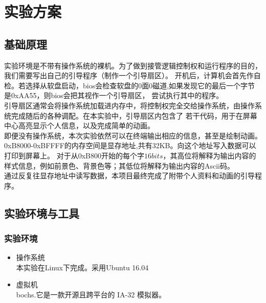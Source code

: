 \documentclass[a4paper]{article}
\begin{document}
\section{实验方案}
\subsection{基础原理}
实验环境是不带有操作系统的裸机。为了做到接管逻辑控制权和运行程序的目的，我们需要写出自己的引导程序（制作一个引导扇区）。
开机后，计算机会首先作自检。若选择从软盘启动，bios会检查软盘的0面0磁道,如果发现它的最后一个字节是0xAA55，则bios会把其视作一个引导扇区，
尝试执行其中的程序。\\ 

引导扇区通常会将操作系统加载进内存中，将控制权完全交给操作系统，由操作系统完成随后的各种调配。在本实验中，引导扇区内包含了
若干代码，用于在屏幕中心高亮显示个人信息，以及完成简单的动画。 \\

即便没有操作系统，本次实验依然可以在终端输出相应的信息，甚至是绘制动画。
0xB8000-0xBFFFF的内存空间是显存地址,共有32KB。向这个地址写入数据可以打印到屏幕上。
对于从0xB800开始的每个字\(16 bits\)，其高位将解释为输出内容的样式信息，例如前景色、背景色等；其低位将解释为输出内容的Ascii码。\\

通过反复往显存地址中读写数据，本项目最终完成了附带个人资料和动画的引导程序。



\subsection{实验环境与工具}
\subsubsection{实验环境}
\begin{itemize}
    \item 操作系统 \\ 
    本实验在Linux下完成。采用Ubuntu 16.04
    \item 虚拟机\\
    bochs.它是一款开源且跨平台的 IA-32 模拟器。
\end{itemize}
\end{document}
